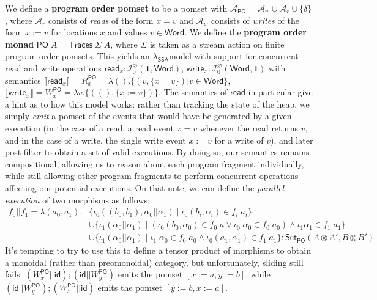 \documentclass[acmsmall,screen,review]{acmart}
\newcommand{\mc}[1]{\ensuremath{\mathcal{#1}}}
\newcommand{\mb}[1]{\ensuremath{\mathbf{#1}}}
\newcommand{\ms}[1]{\ensuremath{\mathsf{#1}}}
\newcommand{\dnt}[1]{\llbracket{#1}\rrbracket}
\newcommand{\isotopessa}{\(\lambda_{\ms{SSA}}\)}
\begin{document}
We define a \textbf{program order pomset} to be a pomset with \(\mc{A}_{\ms{PO}} = \mc{A}_w \cup
\mc{A}_r \cup \{\delta\}\), where \(\mc{A}_r\) consists of \textit{reads} of the form \(x = v\) and
\(\mc{A}_w\) consists of \textit{writes} of the form \(x := v\) for locations \(x\) and values \(v
\in \ms{Word}\). We define the \textbf{program order monad} \(\ms{PO}\;A = \ms{Traces}\;\Sigma\;A\),
where \(\Sigma\) is taken as a stream action on finite program order pomsets. This yields an
\isotopessa model with support for concurrent read and write operations \(\ms{read}_x:
\mc{I}^\varnothing_0(\mb{1}, \ms{Word})\), \(\ms{write}_x: \mc{I}^\varnothing_0(\ms{Word}, \mb{1})\)
with semantics
\(
  \dnt{\ms{read}_x} = R_x^{\ms{PO}} = \lambda (). \{(v, \{x = v\}) | v \in \ms{Word}\}
\),
\(
  \dnt{\ms{write}_x} = W_x^{\ms{PO}} =  \lambda v. \{((), \{x := v\})\}
\).
The semantics of \(\ms{read}\) in particular give a hint as to how this model works: rather than
tracking the state of the heap, we simply \textit{emit} a pomset of the events that would have be
generated by a given execution (in the case of a read, a read event \(x = v\) whenever the read
returns \(v\), and in the case of a write, the single write event \(x := v\) for a write of \(v\)),
and later post-filter to obtain a set of valid executions. By doing so, our semantics remains
compositional, allowing us to reason about each program fragment individually, while still allowing
other program fragments to perform concurrent operations affecting our potential executions. On that
note, we can define the \textit{parallel execution} of two morphisms as follows:
\begin{equation}
  \begin{aligned}
  f_0 || f_1 = \lambda (a_0, a_1). 
  & \{\iota_0 ((b_0, b_1), \alpha_0 || \alpha_1) 
    \mid \iota_0 (b_i, \alpha_i) \in f_i\;a_i\} 
  \\ & \cup \{\iota_1 (\alpha_0 || \alpha_1) 
      \mid (\iota_0 (b_0, \alpha_0) \in f_0\;a \lor \iota_0\;\alpha_0 \in f_0\;a_0) 
      \land \iota_1 \alpha_1 \in f_1\;a_1\} 
  \\ & \cup \{\iota_1 (\alpha_0 || \alpha_1) 
      \mid \iota_1\;\alpha_0 \in f_0\;a_0 
      \land \iota_0 (a_1, \alpha_1) \in f_1\;a_1\}
    : \ms{Set}_{\ms{PO}}(A \otimes A', B \otimes B')
  \end{aligned}
\end{equation}
It's tempting to try to use this to define a tensor product of morphisms to obtain a monoidal
(rather than preomonoidal) category, but unfortunately, sliding still fails: \((W_x^{\ms{PO}} ||
\ms{id}) ; (\ms{id} || W_y^{\ms{PO}})\) emits the pomset \([x := a, y := b]\), while \((\ms{id} ||
W_y^{\ms{PO}}) ; (W_x^{\ms{PO}} || \ms{id})\) emits the pomset \([y := b, x := a]\). 
\end{document}
